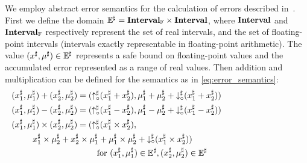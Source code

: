 We employ abstract error semantics for the calculation of errors described
in~\cite{ioualalen, martel07}. First we define the domain $\mathbb{E}^\sharp
= \mathbf{Interval}_\mathbb{F}\times\mathbf{Interval}$, where $\mathbf{Interval}$ and
$\mathbf{Interval}_\mathbb{F}$ respectively represent the set of real intervals, and
the set of floating-point intervals (intervals exactly representable in
floating-point arithmetic). The value $(x^\sharp, \mu^\sharp) \in \mathbb{E}^\sharp$
represents a safe bound on floating-point values and the accumulated error
represented as a range of real values. Then addition and multiplication can be
defined for the semantics as in \eqref{eq:error_semantics}:
\begin{equation}
    \begin{aligned}
        (x^\sharp_1, \mu^\sharp_1) + (x^\sharp_2, \mu^\sharp_2)
    &=  (\roundup(x^\sharp_1 + x^\sharp_2),
         \mu^\sharp_1 + \mu^\sharp_2 +
         \rounddown(x^\sharp_1 + x^\sharp_2)) \\
        (x^\sharp_1, \mu^\sharp_1) - (x^\sharp_2, \mu^\sharp_2)
    &=  (\roundup(x^\sharp_1 - x^\sharp_2),
         \mu^\sharp_1 - \mu^\sharp_2 +
         \rounddown(x^\sharp_1 - x^\sharp_2)) \\
        (x^\sharp_1, \mu^\sharp_1) \times (x^\sharp_2, \mu^\sharp_2)
    &=  (\roundup(x^\sharp_1 \times x^\sharp_2), \\
    \noalign{\quad $
        x^\sharp_1 \times \mu^\sharp_2 + x^\sharp_2 \times \mu^\sharp_1 +
        \mu^\sharp_1 \times \mu^\sharp_2 +
        \rounddown(x^\sharp_1 \times x^\sharp_2))$}
    &\qquad\text{~for~} (x^\sharp_1, \mu^\sharp_1) \in \errorset,
                        (x^\sharp_2, \mu^\sharp_2) \in \errorset
    \end{aligned}
    \label{eq:error_semantics}
\end{equation}

